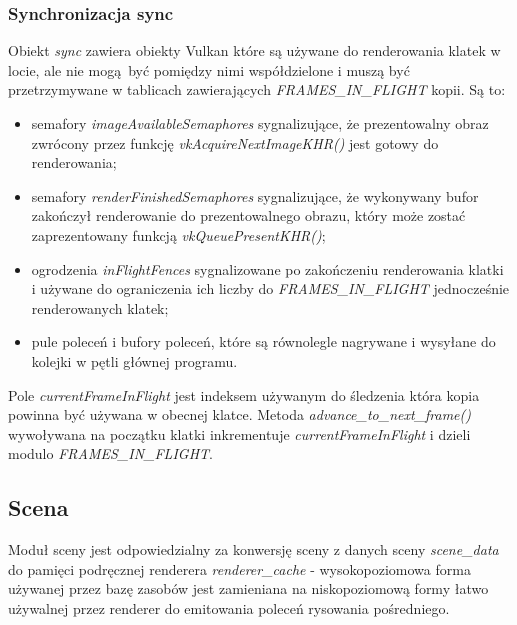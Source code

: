 \subsubsection{Synchronizacja sync}
Obiekt \textit{sync} zawiera obiekty Vulkan które są używane do renderowania klatek w locie, ale nie mogą być pomiędzy nimi współdzielone i muszą być przetrzymywane w tablicach zawierających \textit{FRAMES\_IN\_FLIGHT} kopii.
Są to:
\begin{itemize}
	\item semafory \textit{imageAvailableSemaphores} sygnalizujące, że prezentowalny obraz zwrócony przez funkcję \textit{vkAcquireNextImageKHR()} jest gotowy do renderowania;
	\item semafory \textit{renderFinishedSemaphores} sygnalizujące, że wykonywany bufor zakończył renderowanie do prezentowalnego obrazu, który może zostać zaprezentowany funkcją \textit{vkQueuePresentKHR()};
	\item ogrodzenia \textit{inFlightFences} sygnalizowane po zakończeniu renderowania klatki i używane do ograniczenia ich liczby do \textit{FRAMES\_IN\_FLIGHT} jednocześnie renderowanych klatek;
	\item pule poleceń i bufory poleceń, które są równolegle nagrywane i wysyłane do kolejki w pętli głównej programu.
\end{itemize}

Pole \textit{currentFrameInFlight} jest indeksem używanym do śledzenia która kopia powinna być używana w obecnej klatce.
Metoda \textit{advance\_to\_next\_frame()} wywoływana na początku klatki inkrementuje \textit{currentFrameInFlight} i dzieli modulo \textit{FRAMES\_IN\_FLIGHT}.



\subsection{Scena}

Moduł sceny jest odpowiedzialny za konwersję sceny z danych sceny \textit{scene\_data} do pamięci podręcznej renderera \textit{renderer\_cache} - wysokopoziomowa forma używanej przez bazę zasobów jest zamieniana na niskopoziomową formy łatwo używalnej przez renderer do emitowania poleceń rysowania pośredniego.

